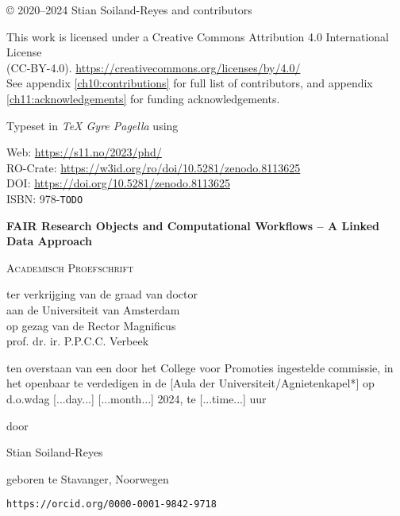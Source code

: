 \newpage

\vspace*{\fill}

© 2020--2024 Stian Soiland-Reyes and contributors

This work is licensed under a Creative Commons Attribution 4.0 International License \\
(CC-BY-4.0). \url{https://creativecommons.org/licenses/by/4.0/}\\
See appendix \ref{ch10:contributions} for full list of contributors, and appendix \ref{ch11:acknowledgements} for funding acknowledgements.


Typeset in \emph{TeX Gyre Pagella} using \mybanner

Web: \url{https://s11.no/2023/phd/} \\
RO-Crate: \url{https://w3id.org/ro/doi/10.5281/zenodo.8113625}\\
DOI: \url{https://doi.org/10.5281/zenodo.8113625}\\
ISBN: 978-\texttt{TODO}

\newpage

\begin{center}

    
\Huge
\textbf{FAIR Research Objects and Computational Workflows – A Linked Data Approach}
     
\vspace*{\fill}

\LARGE
\textsc{Academisch Proefschrift}

\vspace*{\fill}

\large
{ \itshape

ter verkrijging van de graad van doctor\\
aan de Universiteit van Amsterdam\\
op gezag van de Rector Magnificus\\
prof. dr. ir. P.P.C.C. Verbeek

ten overstaan van een door het College voor Promoties ingestelde commissie,
in het openbaar te verdedigen in de [Aula der Universiteit/Agnietenkapel*]
op d.o.wdag [...day...] [...month...] 2024, te [...time...] uur

door 
}

\vspace*{\fill}

\LARGE
Stian Soiland-Reyes

\large
geboren te Stavanger, Noorwegen 

\texttt{https://orcid.org/0000-0001-9842-9718} 
\end{center}

